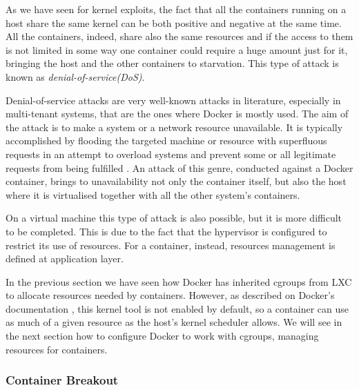 \documentclass[a4paper,12pt]{article}
\begin{document}
As we have seen for kernel exploits, the fact that all the containers running on
a host share the same kernel can be both positive and negative at the same time.
All the containers, indeed, share also the same resources and if the access to
them is not limited in some way one container could require a huge amount just
for it, bringing the host and the other containers to starvation. This type of
attack is known as \textit{denial-of-service(DoS)}.\par Denial-of-service
attacks are very well-known attacks in literature, especially in multi-tenant
systems, that are the ones where Docker is mostly used.  The aim of the attack
is to make a system or a network resource unavailable. It is typically
accomplished by flooding the targeted machine or resource with superfluous
requests in an attempt to overload systems and prevent some or all legitimate
requests from being fulfilled \cite{dos_wikipedia}. An attack of this genre,
conducted against a Docker container, brings to unavailability not only the
container itself, but also the host where it is virtualised together with all
the other system's containers.\par On a virtual machine this type of attack is
also possible, but it is more difficult to be completed. This is due to the fact
that the hypervisor is configured to restrict its use of resources. For a
container, instead, resources management is defined at application layer.\par In
the previous section we have seen how Docker has inherited cgroups from LXC to
allocate resources needed by containers. However, as described on Docker's
documentation \cite{resource_on_docker}, this kernel tool is not enabled by
default, so a container can use as much of a given resource as the host's kernel
scheduler allows. We will see in the next section how to configure Docker to
work with cgroups, managing resources for containers. 


\subsubsection{Container Breakout}
\end{document}
